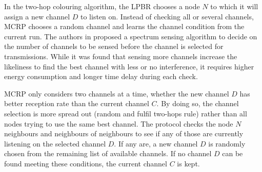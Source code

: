 In the two-hop colouring algorithm, the LPBR chooses a node $N$ to which it will assign a new channel $D$ to listen on.
Instead of checking all or several channels, MCRP chooses a random channel and learns the channel condition from the current run. 
The authors in \cite{energyluca} proposed a spectrum sensing algorithm to decide on the number of channels to be sensed before the channel is selected for transmissions. While it was found that sensing more channels increase the likeliness to find the best channel with less or no interference, it requires higher energy consumption and longer time delay during each check. 

MCRP only considers two channels at a time, whether the new channel $D$ has better reception rate than the current channel $C$. By doing so, the channel selection is more spread out (random and fulfil two-hops rule) rather than all nodes trying to use the same best channel.
The protocol checks the node $N$ neighbours and neighbours of neighbours to see if any of those are currently listening on the selected channel $D$. If any are, a new channel $D$ is randomly chosen from the remaining list of available channels. 
If no channel $D$ can be found meeting these conditions, the current channel $C$ is kept. 

